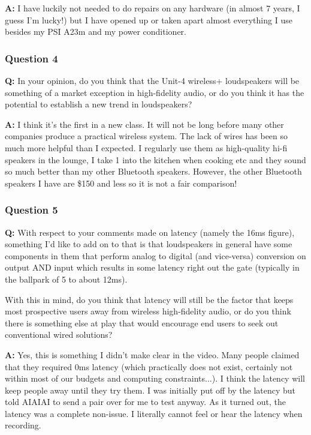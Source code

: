 \documentclass[conference]{IEEEtran}
\begin{document}
\textbf{A:} I have luckily not needed to do repairs on any hardware (in almost 7 years, I
guess I'm lucky!) but I have opened up or taken apart almost everything I use besides my PSI
A23m and my power conditioner.

\subsubsection*{Question 4}
\textbf{Q:} In your opinion, do you think that the Unit-4 wireless+ loudspeakers will be
something of a market exception in high-fidelity audio, or do you think it has the potential
to establish a new trend in loudspeakers?

\textbf{A:}  I think it's the first in a new class. It will not be long before many other
companies produce a practical wireless system. The lack of wires has been so much more
helpful than I expected. I regularly use them as high-quality hi-fi speakers in the lounge, I
take 1 into the kitchen when cooking etc and they sound so much better than my other
Bluetooth speakers. However, the other Bluetooth speakers I have are \$150 and less so it is
not a fair comparison!

\subsubsection*{Question 5}
\textbf{Q:} With respect to your comments made on latency (namely the 16ms figure), something
I'd like to add on to that is that loudspeakers in general have some components in them that
perform analog to digital (and vice-versa) conversion on output AND input which results in
some latency right out the gate (typically in the ballpark of 5 to about 12ms).

With this in mind, do you think that latency will still be the factor that keeps most
prospective users away from wireless high-fidelity audio, or do you think there is something
else at play that would encourage end users to seek out conventional wired solutions?

\textbf{A:} Yes, this is something I didn't make clear in the video. Many people claimed that
they required 0ms latency (which practically does not exist, certainly not within most of our
budgets and computing constraints...). I think the latency will keep people away until they
try them. I was initially put off by the latency but told AIAIAI to send a pair over for me
to test anyway. As it turned out, the latency was a complete non-issue. I literally cannot
feel or hear the latency when recording.
\end{document}
